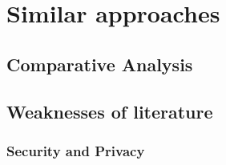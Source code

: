 \section{Similar approaches}



\subsection{Comparative Analysis}

%

\subsection{Weaknesses of literature}

\subsubsection{Security and Privacy}

